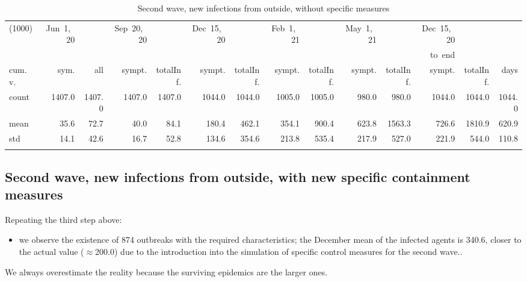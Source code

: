 \documentclass[graybox]{svmult}
\begin{document}
\begin{table}[t]
\center
\tiny
\begin{tabular}{lrrrrrrrrrrrrr}
\hline\noalign{\smallskip}
(1000) & Jun~1,~20 & & Sep~20,~20 & & Dec~15,~20 & & Feb~1,~21 & & May~1,~21 & & Dec~15,~20 \\
& & & & & & & & & & & to~end \\
cum.~v. & sym. & all & sympt. & totalInf. & sympt. & totalInf. & sympt. & totalInf. & sympt. & totalInf. & sympt. & totalInf. & days\\
\noalign{\smallskip}\svhline\noalign{\smallskip}
count & 1407.0 & 1407.0 & 1407.0 & 1407.0 & 1044.0 & 1044.0 & 1005.0 & 1005.0 & 980.0 & 980.0 & 1044.0 & 1044.0 & 1044.0 \\
mean & 35.6 & 72.7 & 40.0 & 84.1 & 180.4 & 462.1 & 354.1 & 900.4 & 623.8 & 1563.3 & 726.6 & 1810.9 & 620.9 \\
std & 14.1 & 42.6 & 16.7 & 52.8 & 134.6 & 354.6 & 213.8 & 535.4 & 217.9 & 527.0 & 221.9 & 544.0 & 110.8 \\
\hline\noalign{\smallskip}
\end{tabular}
\caption{Second wave, new infections from outside, without specific measures}
\label{selForceWave2Tab}
\end{table}



\subsection{Second wave, new infections from outside, with new specific containment measures}
\label{secondWith}

Repeating the third step above:
\begin{itemize}

\item we observe the existence of 874 outbreaks with the required characteristics; the December mean of the infected agents is 340.6, closer to the actual value ($\approx$200.0) due to the introduction into the simulation of specific control measures for the second wave.. 

\end{itemize}

We always overestimate the reality because the surviving epidemics are the larger ones.
\end{document}

